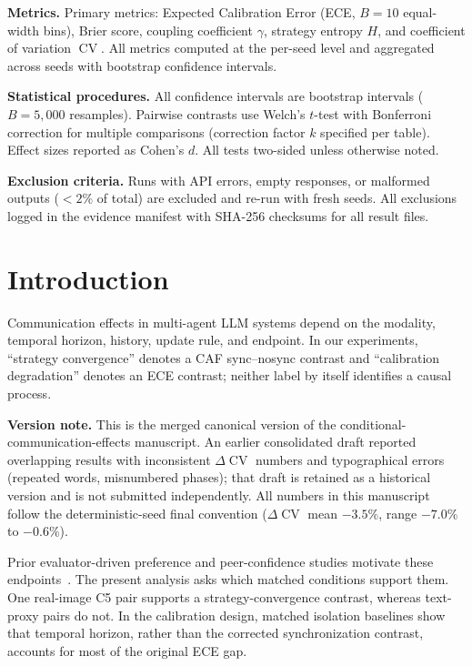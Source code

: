 \documentclass[11pt]{article}
\DeclareMathOperator{\CV}{CV}
\begin{document}
\textbf{Metrics.} Primary metrics: Expected Calibration Error (ECE, $B{=}10$ equal-width bins), Brier score, coupling coefficient $\gamma$, strategy entropy $H$, and coefficient of variation $\CV$. All metrics computed at the per-seed level and aggregated across seeds with bootstrap confidence intervals.

\textbf{Statistical procedures.} All confidence intervals are bootstrap intervals ($B{=}5{,}000$ resamples). Pairwise contrasts use Welch's $t$-test with Bonferroni correction for multiple comparisons (correction factor $k$ specified per table). Effect sizes reported as Cohen's $d$. All tests two-sided unless otherwise noted.

\textbf{Exclusion criteria.} Runs with API errors, empty responses, or malformed outputs ($<2\%$ of total) are excluded and re-run with fresh seeds. All exclusions logged in the evidence manifest with SHA-256 checksums for all result files.

\section{Introduction}

Communication effects in multi-agent LLM systems depend on the modality, temporal horizon, history, update rule, and endpoint. In our experiments, ``strategy convergence'' denotes a CAF sync--nosync contrast and ``calibration degradation'' denotes an ECE contrast; neither label by itself identifies a causal process.

\textbf{Version note.} This is the merged canonical version of the conditional-communication-effects manuscript. An earlier consolidated draft reported overlapping results with inconsistent $\Delta\CV$ numbers and typographical errors (repeated words, misnumbered phases); that draft is retained as a historical version and is not submitted independently. All numbers in this manuscript follow the deterministic-seed final convention ($\Delta\CV$ mean $-3.5\%$, range $-7.0\%$ to $-0.6\%$).

Prior evaluator-driven preference and peer-confidence studies motivate these endpoints~\cite{impossible2026,mmepc2026,calibration2026}. The present analysis asks which matched conditions support them. One real-image C5 pair supports a strategy-convergence contrast, whereas text-proxy pairs do not. In the calibration design, matched isolation baselines show that temporal horizon, rather than the corrected synchronization contrast, accounts for most of the original ECE gap.
\end{document}
